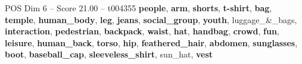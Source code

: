 \begin{textsample}{POS Dim 6 – Score 21.00 – t004355}  \label{ex:f6_pos_004}
\textbf{people}, \textbf{arm}, \textbf{shorts}, \textbf{t-shirt}, \textbf{bag}, \textbf{temple}, \textbf{human\_body}, \textbf{leg}, \textbf{jeans}, \textbf{social\_group}, \textbf{youth}, luggage\_\&\_bags, \textbf{interaction}, \textbf{pedestrian}, \textbf{backpack}, \textbf{waist}, \textbf{hat}, \textbf{handbag}, \textbf{crowd}, \textbf{fun}, \textbf{leisure}, \textbf{human\_back}, \textbf{torso}, \textbf{hip}, \textbf{feathered\_hair}, \textbf{abdomen}, \textbf{sunglasses}, \textbf{boot}, \textbf{baseball\_cap}, \textbf{sleeveless\_shirt}, sun\_hat, \textbf{vest}

\end{textsample}
